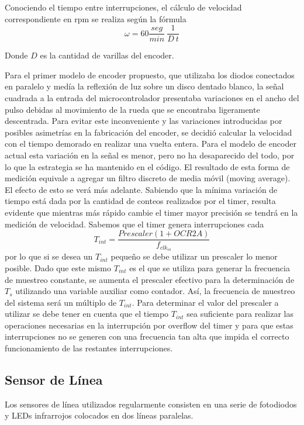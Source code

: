 \documentclass[10pt,conference,a4paper,onecolumn]{article}%
\begin{document}
Conociendo el tiempo entre interrupciones, el cálculo de velocidad correspondiente en rpm se realiza según la fórmula
\begin{equation*}
\omega=60 \frac{seg}{min}\ \frac{1}{D\ t}
\end{equation*}

Donde $D$ es la cantidad de varillas del encoder. 


Para el primer modelo de encoder propuesto, que utilizaba los diodos conectados en paralelo y medía la reflexión de luz sobre un disco dentado blanco, la señal cuadrada a la entrada del microcontrolador presentaba variaciones en el ancho del pulso debidas al movimiento de la rueda que se encontraba ligeramente descentrada. Para evitar este inconveniente y las variaciones introducidas por posibles asimetrías en la fabricación del encoder,
se decidió calcular la velocidad con el tiempo demorado en realizar una vuelta entera. Para el modelo de encoder actual esta variación en la señal es menor, pero no ha desaparecido del todo, por lo que la estrategia se ha mantenido en el código. El resultado de esta forma de medición equivale a agregar un filtro discreto de media móvil (moving average). El efecto de esto se verá más
adelante.
Sabiendo que la mínima variación de tiempo está dada por la cantidad de conteos realizados por el timer, resulta evidente que mientras más rápido cambie el timer mayor precisión se tendrá en la medición de velocidad.
Sabemos que el timer genera interrupciones cada
\begin{equation}
T_{int}=\frac{Prescaler(1+OCR2A)}{f_{clk_{io}}}
\end{equation}
por lo que si se desea un $T_{int}$ pequeño se debe utilizar un prescaler lo menor posible. Dado que este mismo $T_{int}$ es el que se utiliza para generar la frecuencia de muestreo constante, se aumenta el prescaler efectivo para la determinación de $T_s$ utilizando una variable auxiliar como contador. Así, la frecuencia de muestreo del sistema será un múltiplo de $T_{int}$. Para determinar el valor del prescaler a utilizar se debe tener en cuenta que el tiempo $T_{int}$ sea suficiente para realizar las operaciones necesarias en la interrupción por overflow del timer y para que estas interrupciones no se generen con una frecuencia tan alta que impida el correcto funcionamiento de las restantes interrupciones.

\subsection{Sensor de Línea}
Los sensores de línea utilizados regularmente consisten en una serie de fotodiodos y LEDs infrarrojos colocados en dos líneas paralelas. %
\end{document}
